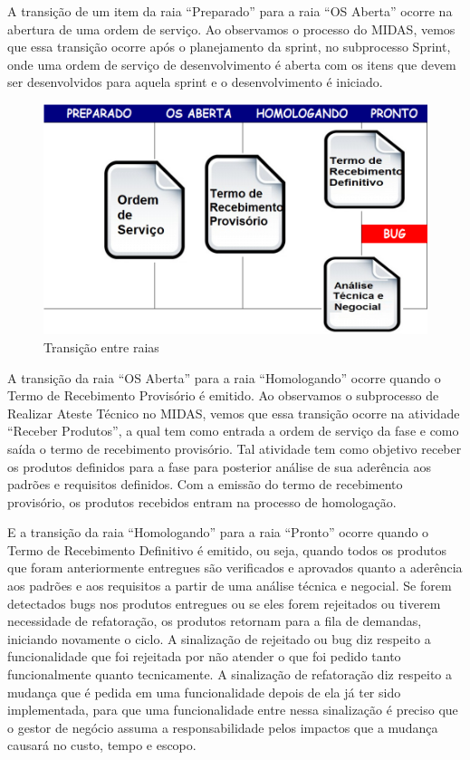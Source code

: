 A transição de um item da raia “Preparado” para a raia “OS Aberta” ocorre na abertura de uma ordem de serviço. Ao observamos o processo do MIDAS, vemos que essa transição ocorre após o planejamento da sprint, no subprocesso Sprint, onde uma ordem de serviço de desenvolvimento é aberta  com os itens que devem ser desenvolvidos para aquela sprint e o desenvolvimento é iniciado. 


\begin{figure}[h]
		\centering
		\label{fig07}
			\includegraphics[scale=0.5]{figuras/kanbanIPHAN3.png}
		\caption{Transição entre raias \cite{parente}}
\end{figure}

A transição da raia “OS Aberta” para a raia “Homologando” ocorre quando o Termo de Recebimento Provisório é emitido. Ao observamos o subprocesso de Realizar Ateste Técnico no MIDAS, vemos que essa transição ocorre na atividade “Receber Produtos”, a qual tem como entrada a ordem de serviço da fase e como saída o termo de recebimento provisório. Tal atividade tem como objetivo receber os produtos definidos para a fase para posterior análise de sua aderência aos padrões e requisitos definidos. Com a emissão do termo de recebimento provisório, os produtos recebidos entram na processo de homologação. 

E a transição da raia “Homologando” para a raia “Pronto” ocorre quando o Termo de Recebimento Definitivo é emitido, ou seja, quando todos os produtos que foram anteriormente entregues são verificados e aprovados quanto a aderência aos padrões e aos requisitos a partir de uma análise técnica e negocial. Se forem detectados bugs nos produtos entregues ou se eles forem rejeitados ou tiverem necessidade de refatoração, os produtos retornam para a fila de demandas, iniciando novamente o ciclo. A sinalização de rejeitado ou bug diz respeito a funcionalidade que foi rejeitada por não atender o que foi pedido tanto funcionalmente quanto tecnicamente. A sinalização de refatoração diz respeito a mudança que é pedida em uma funcionalidade depois de ela já ter sido implementada, para que uma funcionalidade entre nessa sinalização é preciso que o gestor de negócio assuma a responsabilidade pelos impactos que a mudança causará no custo, tempo e escopo.


